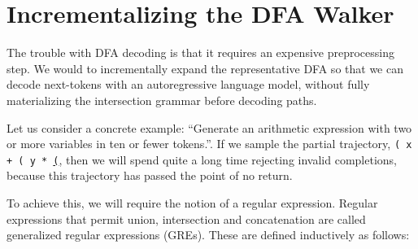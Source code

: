 \documentclass[runningheads]{llncs}
\begin{document}


\clearpage\section{Incrementalizing the DFA Walker}

The trouble with DFA decoding is that it requires an expensive preprocessing step. We would to incrementally expand the representative DFA so that we can decode next-tokens with an autoregressive language model, without fully materializing the intersection grammar before decoding paths.

Let us consider a concrete example: ``Generate an arithmetic expression with two or more variables in ten or fewer tokens.''. If we sample the partial trajectory, \texttt{( x + ( y * }\underline{\texttt{(}}, then we will spend quite a long time rejecting invalid completions, because this trajectory has passed the point of no return. %

To achieve this, we will require the notion of a regular expression. Regular expressions that permit union, intersection and concatenation are called generalized regular expressions (GREs). These are defined inductively as follows:\vspace{-0.5cm}
\end{document}
